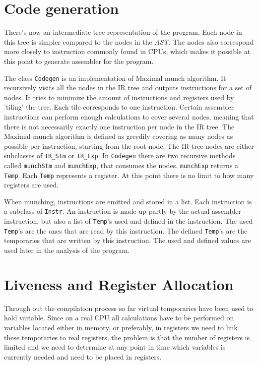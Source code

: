 \documentclass[11pt]{amsart}
\begin{document}
\section{Code generation}
There's now an intermediate tree representation of the program. Each node in this tree is simpler compared to the nodes in the \textit{AST}. The nodes also correspond more closely to instruction commonly found in CPUs, which makes it possible at this point to generate assembler for the program.

The class \texttt{Codegen} is an implementation of Maximal munch\cite{appel} algorithm. It recursively visits all the nodes in the IR tree and outputs instructions for a set of nodes. It tries to minimize the amount of instructions and registers used by 'tiling' the tree. Each tile corresponds to one instruction. Certain assembler instructions can perform enough calculations to cover several nodes, meaning that there is not necessarily exactly one instruction per node in the IR tree. The Maximal munch algorithm is defined as greedily covering as many nodes as possible per instruction, starting from the root node. The IR tree nodes are either subclasses of  \texttt{IR\_Stm} or \texttt{IR\_Exp}. In \texttt{Codegen} there are two recursive methods called \texttt{munchStm} and \texttt{munchExp}, that consumes the nodes. \texttt{munchExp} returns a \texttt{Temp}. Each \texttt{Temp} represents a register. At this point there is no limit to how many registers are used.

When munching, instructions are emitted and stored in a list. Each instruction is a subclass of \texttt{Instr}. An instruction is made up partly by the actual assembler instruction, but also a list of \texttt{Temp}'s used and defined in the instruction. The used \texttt{Temp}'s are the ones that are read by this instruction. The defined \texttt{Temp}'s are the temporaries that are written by this instruction. The used and defined values are used later in the analysis of the program.

\section{Liveness and Register Allocation}
Through out the compilation process so far virtual temporaries have been used to hold variable. Since on a real CPU all calculations have to be performed on variables located either in memory, or preferably, in registers we need to link these temporaries to real registers, the problem is that the number of registers is limited and we need to determine at any point in time which variables is currently needed and need to be placed in registers.
\end{document}
